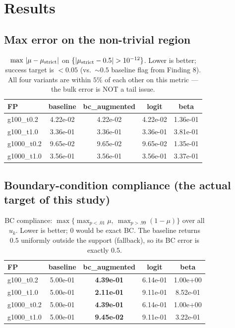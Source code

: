 \documentclass[11pt]{article}
\begin{document}
\section{Results}

\subsection{Max error on the non-trivial region}

\begin{table}[h]
\centering
\caption{$\max\,|\mu-\mu_{\rm strict}|$ on $\{|\mu_{\rm strict}-0.5|>10^{-12}\}$.
         Lower is better; success target is $<\!0.05$ (vs.\ $\sim\!0.5$ baseline
         flag from Finding 8). All four variants are within $5\%$ of each
         other on this metric --- the bulk error is NOT a tail issue.}
\begin{tabular}{lcccc}
\toprule
FP  & baseline & bc\_augmented & logit & beta \\
\midrule
g100\_t0.2  & 4.22e-02 & 4.22e-02 & 4.22e-02 & 1.36e-01 \\
g100\_t1.0  & 3.36e-01 & 3.36e-01 & 3.36e-01 & 3.81e-01 \\
g1000\_t0.2 & 9.65e-02 & 9.65e-02 & 9.65e-02 & 1.35e-01 \\
g1000\_t1.0 & 3.56e-01 & 3.56e-01 & 3.56e-01 & 3.37e-01 \\
\bottomrule
\end{tabular}
\end{table}

\subsection{Boundary-condition compliance (the actual target of this study)}

\begin{table}[h]
\centering
\caption{BC compliance: $\max\bigl\{\max_{p<.01}\mu,\ \max_{p>.99}(1-\mu)\bigr\}$
         over all $u_k$. Lower is better; $0$ would be exact BC. The baseline
         returns $0.5$ uniformly outside the support (fallback), so its BC
         error is exactly $0.5$.}
\begin{tabular}{lcccc}
\toprule
FP  & baseline & \textbf{bc\_augmented} & logit & beta \\
\midrule
g100\_t0.2  & 5.00e-01 & \textbf{4.39e-01} & 6.14e-01 & 1.00e+00 \\
g100\_t1.0  & 5.00e-01 & \textbf{2.11e-01} & 9.11e-01 & 8.52e-01 \\
g1000\_t0.2 & 5.00e-01 & \textbf{4.39e-01} & 6.14e-01 & 1.00e+00 \\
g1000\_t1.0 & 5.00e-01 & \textbf{9.45e-02} & 9.11e-01 & 3.22e-01 \\
\bottomrule
\end{tabular}
\end{table}
\end{document}
